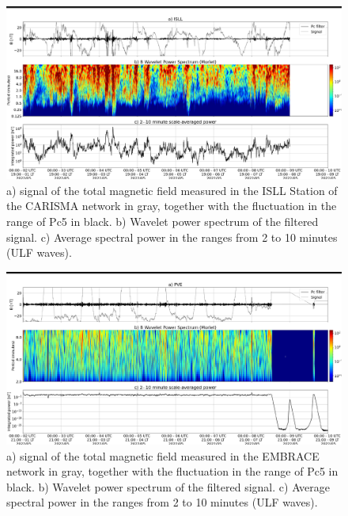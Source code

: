 \documentclass[11pt, oneside]{article}
\begin{document}
\begin{figure}[H]
    
                        \centering
   
                             \includegraphics[width=14cm]{./figures//figureULF_0.png}

                             \caption{a) signal of the total magnetic 
                              field measured in the ISLL Station of the CARISMA 
                              network in gray, together with the fluctuation in the 
                              range of Pc5 in black. b) Wavelet power spectrum of the 
                              filtered signal. c) Average spectral power in the ranges 
                              from 2 to 10 minutes (ULF waves).}
                        \end{figure}

                     \begin{figure}[H]
    
                        \centering
   
                             \includegraphics[width=14cm]{./figures//figureULF_1.png}

                             \caption{a) signal of the total magnetic field 
                              measured in the EMBRACE network in gray, together with
                               the fluctuation in the range of Pc5 in black. b)
                                Wavelet power spectrum of the filtered signal. c) 
                                Average spectral power in the ranges from 2 to 10
                                 minutes (ULF waves).}
                        \end{figure}
\end{document}
